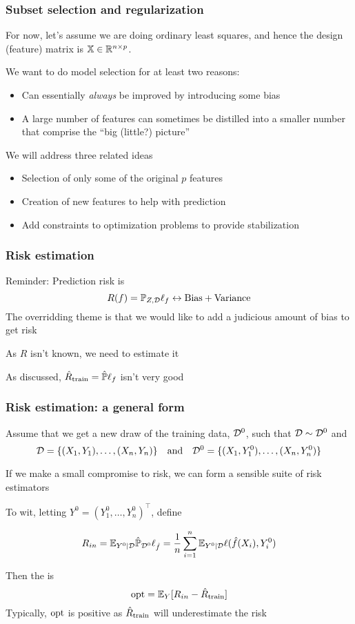 \documentclass{beamer}
\begin{document}
\begin{frame}
\frametitle{Subset selection and regularization}
For now, let's assume we are doing ordinary least squares, and hence the design (feature) matrix is $\mathbb{X} \in \mathbb{R}^{n \times p}$.

\vsp
We want to do model selection for at least two reasons:
\begin{itemize}
\item {} Can essentially {\it always} be improved by introducing some bias 
\item {} A large number of features can sometimes be distilled into a smaller number that comprise the  ``big (little?) picture''
\end{itemize}

We will address three related ideas 
\begin{itemize}
\item {} Selection of only some of the original $p$ features
\item {} Creation of new features to help with prediction
\item {} Add constraints to optimization problems to provide stabilization
\end{itemize}
\end{frame}


\begin{frame}
\frametitle{Risk estimation}
Reminder:  Prediction risk is
\[
R(f) = \mathbb{P}_{Z,\mathcal{D}} \ell_f \leftrightarrow \textrm{Bias} + \textrm{Variance}
\]
The overridding theme is that we would like to add a judicious amount of bias to get  risk

\vsp
As $R$ isn't known, we need to estimate it

\vsp
As discussed, $\hat{R}_{\textrm{train}} = \hat{\mathbb{P}}\ell_f$ isn't very good

\end{frame}

\begin{frame}
\frametitle{Risk estimation: a general form}
Assume that we get a new draw of the training data, $\mathcal{D}^0$, such that $\mathcal{D} \sim \mathcal{D}^0$ and
\[
\mathcal{D} = \{(X_1,Y_1), \ldots, (X_n,Y_n)\} \quad \textrm{and} \quad \mathcal{D}^0 = \{(X_1,Y_1^0), \ldots, (X_n,Y_n^0)\}
\]

\vsp
If we make a small compromise to risk, we can form a sensible suite of risk estimators

\vsp
To wit, letting $Y^0 = (Y_1^0,\ldots,Y_n^0)^{\top}$, define 

\[
R_{in} = \mathbb{E}_{Y^0 | \mathcal{D}}  \hat{\mathbb{P}}_{\mathcal{D}^0}  \ell_{\hat{f}}= \frac{1}{n} \sum_{i=1}^n \mathbb{E}_{Y^0 | \mathcal{D}} \ell(\hat{f}(X_i),Y_i^0)
\]
\vsp

Then the  is
\[
\textrm{opt} = \mathbb{E}_Y [ R_{in} - \hat{R}_{\textrm{train}}]
\]
Typically, $\textrm{opt}$ is positive as $\hat{R}_{\textrm{train}}$ will underestimate the risk
\end{frame}
\end{document}
